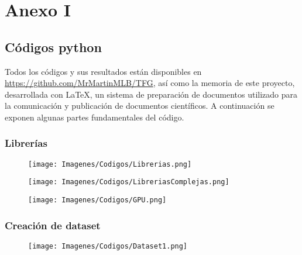 \documentclass{report}
\begin{document}
\appendix %
\clearpage
\chapter{Anexo I}



\section{Códigos python}
Todos los códigos y sus resultados están disponibles en \url{https://github.com/MrMartinMLB/TFG}, así como la memoria de este proyecto, desarrollada con LaTeX, un sistema de preparación de documentos utilizado para la comunicación y publicación de documentos científicos.  A continuación se exponen algunas partes fundamentales del código.




\subsection{Librerías}

\begin{figure}[H]
    \raggedright
    \texttt{[image: Imagenes/Codigos/Librerias.png]}
\end{figure}


\begin{figure}[H]
    \raggedright
    \texttt{[image: Imagenes/Codigos/LibreriasComplejas.png]}
\end{figure}


\begin{figure}[H]
    \raggedright
    \texttt{[image: Imagenes/Codigos/GPU.png]}
\end{figure}








\subsection{Creación de dataset}

\begin{figure}[H]
    \raggedright
    \texttt{[image: Imagenes/Codigos/Dataset1.png]}
\end{figure}
\end{document}

